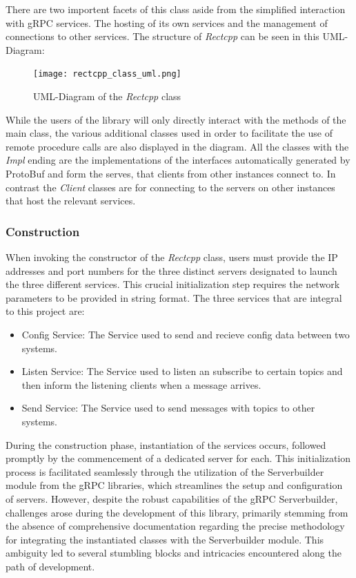 There are two importent facets of this class aside from the simplified interaction with gRPC services. The hosting of its own services and the management of
connections to other services. The structure of \textit{Rectcpp} can be seen in this UML-Diagram:\\

\begin{figure}[H]
  \centering
	\texttt{[image: rectcpp\_class\_uml.png]} 
	\caption{UML-Diagram of the \textit{Rectcpp} class}
	\label{fig:rectcppClassUML}
\end{figure}

While the users of the library will only directly interact with the methods of the main class, the various additional classes used in order to facilitate the
use of remote procedure calls are also displayed in the diagram. All the classes with the \textit{Impl} ending are the implementations of the interfaces automatically
generated by ProtoBuf and form the serves, that clients from other instances connect to. In contrast the \textit{Client} classes are for connecting to the servers
on other instances that host the relevant services.  

\subsubsection{Construction}
When invoking the constructor of the \textit{Rectcpp} class, users must provide the IP addresses and port numbers for the three distinct servers designated to launch the 
three different services. This crucial initialization step requires the network parameters to be provided in string format. The three services that are integral 
to this project are:  

\begin{itemize}
  \item{Config Service:} The Service used to send and recieve config data between two systems.
  \item{Listen Service:} The Service used to listen an subscribe to certain topics and then inform the listening clients when a message arrives.
  \item{Send Service:} The Service used to send messages with topics to other systems.
\end{itemize}

During the construction phase, instantiation of the services occurs, followed promptly by the commencement of a dedicated server for each. This initialization 
process is facilitated seamlessly through the utilization of the Serverbuilder module from the gRPC libraries, which streamlines the setup and configuration of 
servers. However, despite the robust capabilities of the gRPC Serverbuilder, challenges arose during the development of this library, primarily stemming from the absence 
of comprehensive documentation regarding the precise methodology for integrating the instantiated classes with the Serverbuilder module. This ambiguity led to 
several stumbling blocks and intricacies encountered along the path of development.

